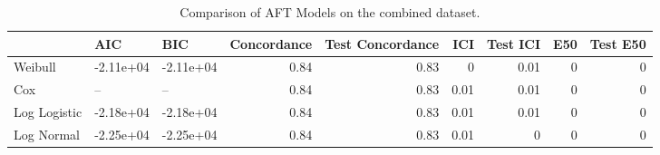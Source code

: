 \begin{table*}
\centering
\caption{Comparison of AFT Models on the combined dataset.}
\label{tab:combined}
\begin{tabular}{lllrrrrrr}
\toprule
 & AIC & BIC & Concordance & Test Concordance & ICI & Test ICI & E50 & Test E50 \\
\midrule
Weibull & -2.11e+04 & -2.11e+04 & 0.84 & 0.83 & 0 & 0.01 & 0 & 0 \\
Cox & -- & -- & 0.84 & 0.83 & 0.01 & 0.01 & 0 & 0 \\
Log Logistic & -2.18e+04 & -2.18e+04 & 0.84 & 0.83 & 0.01 & 0.01 & 0 & 0 \\
Log Normal & -2.25e+04 & -2.25e+04 & 0.84 & 0.83 & 0.01 & 0 & 0 & 0 \\
\bottomrule
\end{tabular}
\end{table*}
